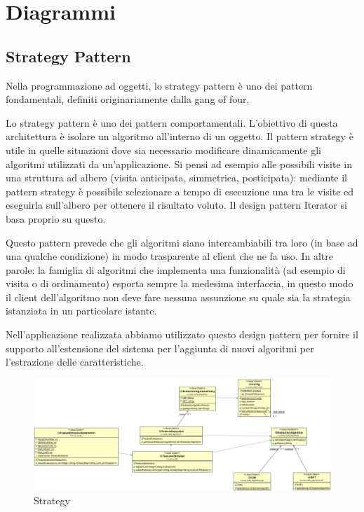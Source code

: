 \chapter{Diagrammi}

\section{Strategy Pattern}
Nella programmazione ad oggetti, lo strategy pattern è uno dei pattern fondamentali, definiti originariamente dalla gang of four.

Lo strategy pattern è uno dei pattern comportamentali. L'obiettivo di questa architettura è isolare un algoritmo all'interno di un oggetto. Il pattern strategy è utile in quelle situazioni dove sia necessario modificare dinamicamente gli algoritmi utilizzati da un'applicazione. Si pensi ad esempio alle possibili visite in una struttura ad albero (visita anticipata, simmetrica, posticipata): mediante il pattern strategy è possibile selezionare a tempo di esecuzione una tra le visite ed eseguirla sull'albero per ottenere il risultato voluto. Il design pattern Iterator si basa proprio su questo.

Questo pattern prevede che gli algoritmi siano intercambiabili tra loro (in base ad una qualche condizione) in modo trasparente al client che ne fa uso. In altre parole: la famiglia di algoritmi che implementa una funzionalità (ad esempio di visita o di ordinamento) esporta sempre la medesima interfaccia, in questo modo il client dell'algoritmo non deve fare nessuna assunzione su quale sia la strategia istanziata in un particolare istante.

Nell'applicazione realizzata abbiamo utilizzato questo design pattern per fornire il supporto all'estensione del sistema per l'aggiunta di nuovi algoritmi per l'estrazione delle caratteristiche.

\begin{figure}[ht]
	\centering
	\includegraphics[width=1.5\textwidth, angle=90]{img/strategy.png}
	\caption{Strategy}\label{fig:strategy}
\end{figure}

